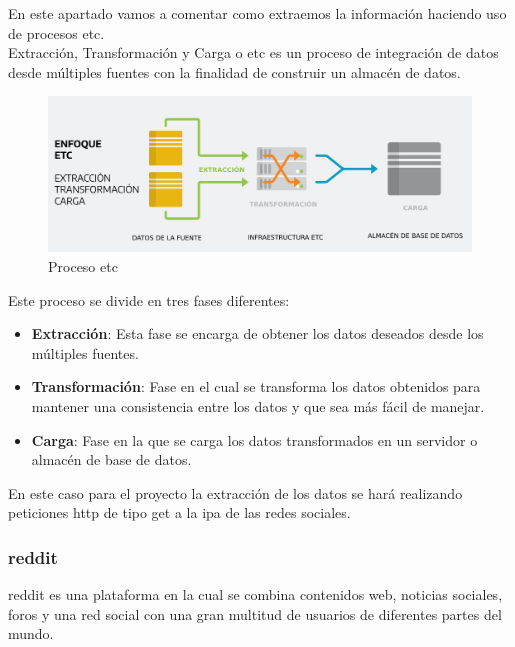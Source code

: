 \documentclass[../../main.tex]{subfiles}
\begin{document}
En este apartado vamos a comentar como extraemos la información haciendo uso de procesos \gls{etc}.  \\

Extracción, Transformación y Carga o \gls{etc} es un proceso de integración de datos desde múltiples fuentes con la finalidad de construir un almacén de datos.  \\

\begin{figure}[H]
\centering
\includegraphics[width=1\textwidth]{images/info/etl.png}
\caption{Proceso \gls{etc}}
\end{figure}

Este proceso se divide en tres fases diferentes:

\begin{itemize}
    \item \textbf{Extracción}: Esta fase se encarga de obtener los datos deseados desde los múltiples fuentes.
    \item \textbf{Transformación}: Fase en el cual se transforma los datos obtenidos para mantener una consistencia entre los datos y que sea más fácil de manejar.
    \item \textbf{Carga}: Fase en la que se carga los datos transformados en un servidor o almacén de base de datos.
\end{itemize}


En este caso para el proyecto la extracción de los datos se hará realizando peticiones \gls{http} de tipo \gls{get} a la \gls{ipa} de las redes sociales.

\subsubsection{\Gls{reddit}}

\Gls{reddit}\cite{doc18} es una plataforma en la cual se combina contenidos web, noticias sociales, foros y una red social con una gran multitud de usuarios de diferentes partes del mundo.  \\
\end{document}
